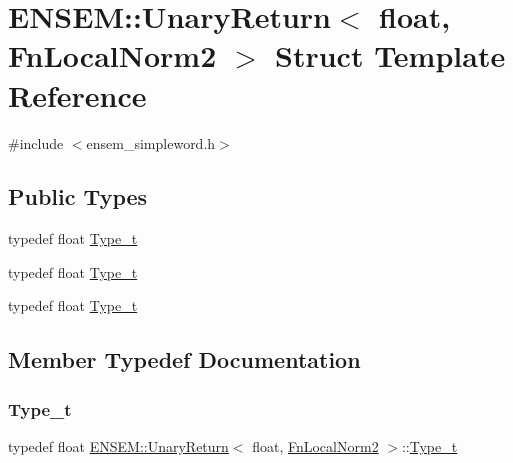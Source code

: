 \hypertarget{structENSEM_1_1UnaryReturn_3_01float_00_01FnLocalNorm2_01_4}{}\section{E\+N\+S\+EM\+:\+:Unary\+Return$<$ float, Fn\+Local\+Norm2 $>$ Struct Template Reference}
\label{structENSEM_1_1UnaryReturn_3_01float_00_01FnLocalNorm2_01_4}


{\ttfamily \#include $<$ensem\+\_\+simpleword.\+h$>$}

\subsection*{Public Types}
\begin{DoxyCompactItemize}
\item 
typedef float \mbox{\hyperlink{structENSEM_1_1UnaryReturn_3_01float_00_01FnLocalNorm2_01_4_ae3f20d3aa61a3012baf0d735dd9441d8}{Type\+\_\+t}}
\item 
typedef float \mbox{\hyperlink{structENSEM_1_1UnaryReturn_3_01float_00_01FnLocalNorm2_01_4_ae3f20d3aa61a3012baf0d735dd9441d8}{Type\+\_\+t}}
\item 
typedef float \mbox{\hyperlink{structENSEM_1_1UnaryReturn_3_01float_00_01FnLocalNorm2_01_4_ae3f20d3aa61a3012baf0d735dd9441d8}{Type\+\_\+t}}
\end{DoxyCompactItemize}


\subsection{Member Typedef Documentation}
\mbox{\label{structENSEM_1_1UnaryReturn_3_01float_00_01FnLocalNorm2_01_4_ae3f20d3aa61a3012baf0d735dd9441d8}} 
\subsubsection{\texorpdfstring{Type\_t}{Type\_t}\hspace{0.1cm}{\footnotesize\ttfamily [1/3]}}
{\footnotesize\ttfamily typedef float \mbox{\hyperlink{structENSEM_1_1UnaryReturn}{E\+N\+S\+E\+M\+::\+Unary\+Return}}$<$ float, \mbox{\hyperlink{structENSEM_1_1FnLocalNorm2}{Fn\+Local\+Norm2}} $>$\+::\mbox{\hyperlink{structENSEM_1_1UnaryReturn_3_01float_00_01FnLocalNorm2_01_4_ae3f20d3aa61a3012baf0d735dd9441d8}{Type\+\_\+t}}}


